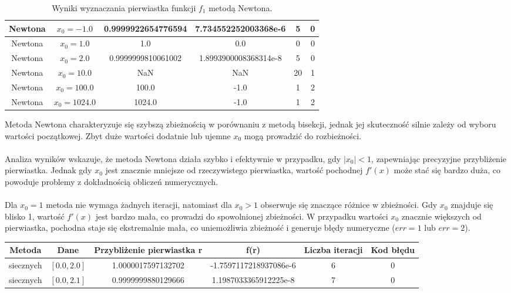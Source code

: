 \documentclass{article}
\begin{document}
\begin{enumerate}[label=(\alph*)]
\begin{table}[H]
\begin{tabular}{|c|c||c|c|c|c|}
        \hline
        Newtona & $x_0 = -1.0$ & 0.9999922654776594 & 7.734552252003368e-6 & 5 & 0\\
        \hline
        Newtona & $x_0 = 1.0 $ & 1.0 & 0.0 & 0 & 0 \\
        \hline
        Newtona &$x_0 =2.0$ &0.9999999810061002 & 1.8993900008368314e-8 & 5 & 0\\
        \hline
        Newtona & $x_0 = 10.0$ & NaN & NaN & 20 & 1 \\
        \hline
        Newtona &$x_0 =  100.0$ &100.0 & -1.0 & 1 & 2\\
        \hline
        Newtona & $x_0 = 1024.0$ & 1024.0 & -1.0 & 1 & 2\\
        \hline
            \end{tabular}
    \caption{Wyniki wyznaczania pierwiastka funkcji $f_1$ metodą Newtona.}
\end{table}
Metoda Newtona charakteryzuje się szybszą zbieżnością w porównaniu z metodą bisekcji, jednak jej skuteczność silnie zależy od wyboru wartości początkowej. Zbyt duże wartości dodatnie lub ujemne \(x_0\) mogą prowadzić do rozbieżności.
\\ \\
Analiza wyników wskazuje, że metoda Newtona działa szybko i efektywnie w przypadku, gdy \(|x_0| < 1\), zapewniając precyzyjne przybliżenie pierwiastka. Jednak gdy \(x_0\) jest znacznie mniejsze od rzeczywistego pierwiastka, wartość pochodnej \(f'(x)\) może stać się bardzo duża, co powoduje problemy z dokładnością obliczeń numerycznych.
\\ \\ 
Dla \(x_0 = 1\) metoda nie wymaga żadnych iteracji, natomiast dla \(x_0 > 1\) obserwuje się znaczące różnice w zbieżności. Gdy \(x_0\) znajduje się blisko 1, wartość \(f'(x)\) jest bardzo mała, co prowadzi do spowolnionej zbieżności. W przypadku wartości \(x_0\) znacznie większych od pierwiastka, pochodna staje się ekstremalnie mała, co uniemożliwia zbieżność i generuje błędy numeryczne (\(err = 1\) lub \(err = 2\)).
            \begin{table}[H]
    \centering
    \begin{tabular}{|c|c||c|c|c|c|}
        \hline
        Metoda & Dane & Przybliżenie pierwiastka r & f(r) & Liczba iteracji & Kod błędu\\
        \hline
        \hline
        siecznych & $[0.0, 2.0]$ & 1.0000017597132702 & -1.7597117218937086e-6 & 6 & 0 \\
        \hline
        siecznych & $[0.0, 2.1]$ & 0.9999999880129666 & 1.1987033365912225e-8 & 7 & 0\\

\end{tabular}
\end{table}
\end{enumerate}
\end{document}

